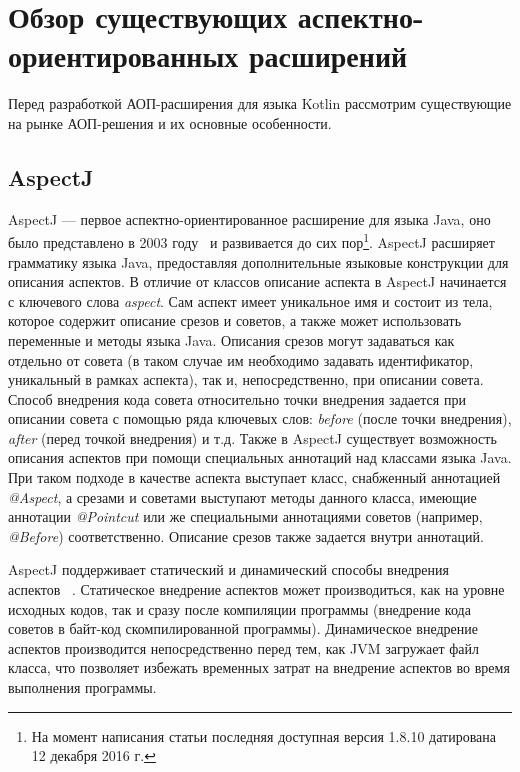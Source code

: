 \documentclass[conference]{IEEEtran}
\begin{document}
\section{Обзор существующих аспектно-ориентированных расширений}

Перед разработкой АОП-расширения для языка Kotlin рассмотрим существующие на
рынке АОП-решения и их основные особенности.

\subsection{AspectJ}
AspectJ --- первое аспектно-ориентированное расширение для языка Java, оно 
было представлено в 2003 году~\cite{kiczales_aspectj} и развивается до сих 
пор\footnote{На момент написания статьи последняя доступная версия 1.8.10 
датирована 12 декабря 2016 г.}.
AspectJ расширяет грамматику языка Java, предоставляя дополнительные языковые
конструкции для описания аспектов.
В отличие от классов описание аспекта в AspectJ начинается с ключевого слова
\textit{aspect}. Сам аспект имеет уникальное имя и состоит из тела, которое 
содержит описание срезов и советов, а также может использовать переменные и 
методы языка Java.
Описания срезов могут задаваться как отдельно от совета (в таком случае им
необходимо задавать идентификатор, уникальный в рамках аспекта), так и,
непосредственно, при описании совета.
Способ внедрения кода совета относительно точки внедрения задается при
описании совета с помощью ряда ключевых слов: \textit{before} (после точки
внедрения), \textit{after} (перед точкой внедрения) и т.д.
Также в AspectJ существует возможность описания аспектов при помощи специальных
аннотаций над классами языка Java.
При таком подходе в качестве аспекта выступает класс, снабженный аннотацией
\textit{@Aspect}, а срезами и советами выступают методы данного класса,
имеющие аннотации \textit{@Pointcut} или же специальными аннотациями советов
(например, \textit{@Before}) соответственно.
Описание срезов также задается внутри аннотаций.

AspectJ поддерживает статический и динамический способы внедрения аспектов~
\cite{aspectj_doc}.
Статическое внедрение аспектов может производиться, как на уровне исходных
кодов, так и сразу после компиляции программы (внедрение кода советов в байт-код
скомпилированной программы).
Динамическое внедрение аспектов производится непосредственно перед тем, как JVM
загружает файл класса, что позволяет избежать временных затрат на внедрение
аспектов во время выполнения программы.
\end{document}
